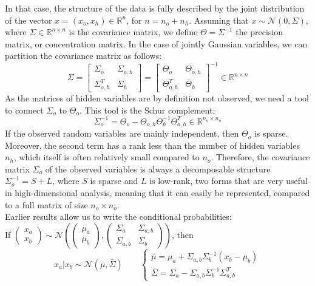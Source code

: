 \documentclass[12pt, openany]{report}
\newcommand{\R}{\mathbb{R}}
\theoremstyle{definition}
\begin{document}
In that case, the structure of the data is fully described by the joint distribution of the vector $x=(x_o,x_h)\in \R^n$, for $n=n_o+n_h$. Assuming that $x\sim \mathcal{N}(0,\Sigma)$, where $\Sigma \in \R^{n\times n}$ is the covariance matrix, we define $\Theta=\Sigma^{-1}$ the precision matrix, or concentration matrix. In the case of jointly Gaussian variables, we can partition the covariance matrix as follows:
\begin{equation}
	\Sigma = \begin{bmatrix}
		\Sigma_o & \Sigma_{o,h}\\ \Sigma_{o,h}^T & \Sigma_h 
	\end{bmatrix} = \begin{bmatrix}
		\Theta_o & \Theta_{o,h}\\ \Theta_{o,h}^T & \Theta_h 
	\end{bmatrix}^{-1} \in \R^{n\times n}
\end{equation}
As the matrices of hidden variables are by definition not observed, we need a tool to connect $\Sigma_o$ to $\Theta_o$. This tool is the Schur complement:
\begin{equation}
	\Sigma_o^{-1} = \Theta_o - \Theta_{o,h}\Theta_h^{-1}\Theta_{o,h}^T \in \R^{n_o\times n_o}
\end{equation}
If the observed random variables are mainly independent, then $\Theta_o$ is sparse. Moreover, the second term has a rank less than the number of hidden variables $n_h$, which itself is often relatively small compared to $n_o$. Therefore, the covariance matrix $\Sigma_o$ of the observed variables is always a decomposable structure $\Sigma_o^{-1} = S+L$, where $S$ is sparse and $L$ is low-rank, two forms that are very useful in high-dimensional analysis, meaning that it can easily be represented, compared to a full matrix of size $n_o\times n_o$. \\
Earlier results allow us to write the conditional probabilities:\\

If $\begin{pmatrix}
	x_a\\x_b
\end{pmatrix} \sim \mathcal{N}\left(\begin{pmatrix}
	\mu_a\\\mu_b
\end{pmatrix}, \begin{pmatrix}
	\Sigma_a& \Sigma_{a,b}\\ \Sigma_{a,b} & \Sigma_b
\end{pmatrix}\right)$, then 
\begin{equation}
	x_a|x_b \sim \mathcal{N}(\bar \mu, \bar \Sigma) \qquad \begin{cases}
		\bar \mu = \mu_a + \Sigma_{a,b}\Sigma_b^{-1} (x_b-\mu_b)\\
		\bar \Sigma = \Sigma_a - \Sigma_{a,b}\Sigma_b^{-1}\Sigma_{a,b}^T
	\end{cases}
\end{equation}
\end{document}

